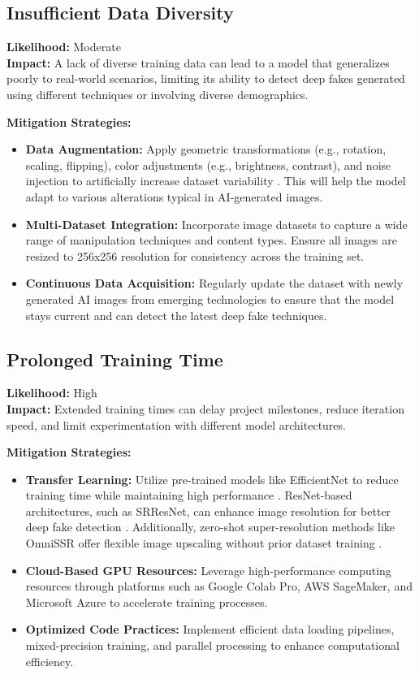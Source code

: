 \documentclass{article} %
\begin{document}
\subsection{Insufficient Data Diversity}
\textbf{Likelihood:} Moderate \\
\textbf{Impact:} A lack of diverse training data can lead to a model that generalizes poorly to real-world scenarios, limiting its ability to detect deep fakes generated using different techniques or involving diverse demographics.

\textbf{Mitigation Strategies:}
\begin{itemize}
    \item \textbf{Data Augmentation:} Apply geometric transformations (e.g., rotation, scaling, flipping), color adjustments (e.g., brightness, contrast), and noise injection to artificially increase dataset variability \cite{shorten2019}. This will help the model adapt to various alterations typical in AI-generated images.
    \item \textbf{Multi-Dataset Integration:} Incorporate image datasets to capture a wide range of manipulation techniques and content types. Ensure all images are resized to 256x256 resolution for consistency across the training set.
    \item \textbf{Continuous Data Acquisition:} Regularly update the dataset with newly generated AI images from emerging technologies to ensure that the model stays current and can detect the latest deep fake techniques.
\end{itemize}

\subsection{Prolonged Training Time}
\textbf{Likelihood:} High \\
\textbf{Impact:} Extended training times can delay project milestones, reduce iteration speed, and limit experimentation with different model architectures.

\textbf{Mitigation Strategies:}
\begin{itemize}
    \item \textbf{Transfer Learning:} Utilize pre-trained models like EfficientNet to reduce training time while maintaining high performance \cite{tan2019}. ResNet-based architectures, such as SRResNet, can enhance image resolution for better deep fake detection \cite{ledig2017}. Additionally, zero-shot super-resolution methods like OmniSSR offer flexible image upscaling without prior dataset training \cite{liu2020}.
    \item \textbf{Cloud-Based GPU Resources:} Leverage high-performance computing resources through platforms such as Google Colab Pro, AWS SageMaker, and Microsoft Azure to accelerate training processes.
    \item \textbf{Optimized Code Practices:} Implement efficient data loading pipelines, mixed-precision training, and parallel processing to enhance computational efficiency.
\end{itemize}
\end{document}
